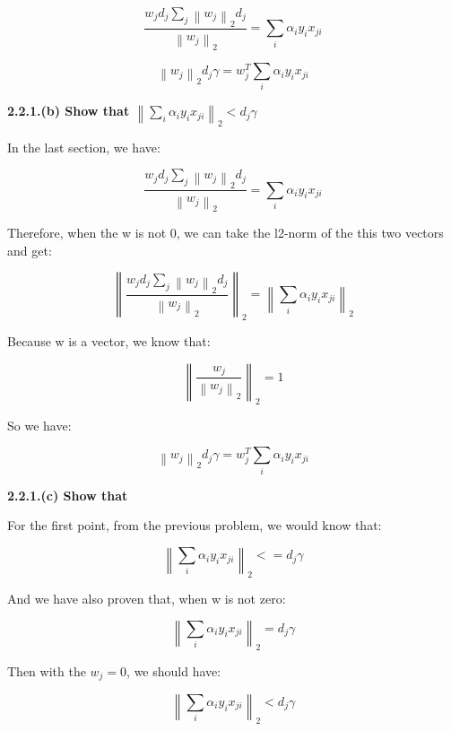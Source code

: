 \documentclass{article} %
\newcommand{\norm}[1]{\left\lVert #1 \right\rVert}
\begin{document}
\begin{equation}
\frac{w_j d_j \sum_j \norm{w_j}_2 d_j }{\norm{w_j}_2} = \sum_i \alpha_i y_i x_{ji}
\end{equation}

\begin{equation}
\norm{w_j}_2 d_j \gamma = w_j^T \sum_i \alpha_i y_i x_{ji}
\end{equation}

\textbf{2.2.1.(b) Show that $\norm{\sum_i \alpha_i y_i x_{ji}}_2 < d_j \gamma$}

In the last section, we have:

\begin{equation}
\frac{w_j d_j \sum_j \norm{w_j}_2 d_j }{\norm{w_j}_2} = \sum_i \alpha_i y_i x_{ji}
\end{equation}

Therefore, when the w is not 0, we can take the l2-norm of the this two vectors
and get:

\begin{equation}
\norm{\frac{w_j d_j \sum_j \norm{w_j}_2 d_j }{\norm{w_j}_2}}_2
= \norm{\sum_i \alpha_i y_i x_{ji}}_2
\end{equation}

Because w is a vector, we know that:

\begin{equation}
\norm{\frac{w_j}{\norm{w_j}_2}}_2 = 1
\end{equation}

So we have:

\begin{equation}
\norm{w_j}_2 d_j \gamma = w_j^T \sum_i \alpha_i y_i x_{ji}
\end{equation}

\textbf{2.2.1.(c) Show that}

For the first point, from the previous problem, we would know that:

\begin{equation}
\norm{\sum_i \alpha_i y_i x_{ji}}_2 <= d_j \gamma
\end{equation}

And we have also proven that, when w is not zero:

\begin{equation}
\norm{\sum_i \alpha_i y_i x_{ji}}_2 = d_j \gamma
\end{equation}

Then with the $w_j = 0$, we should have:

\begin{equation}
\norm{\sum_i \alpha_i y_i x_{ji}}_2 < d_j \gamma
\end{equation}
\end{document}
